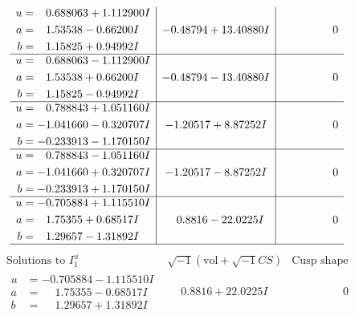 \documentclass[1p]{elsarticle_modified}
\theoremstyle{definition}
\newcommand{\I}{\sqrt{-1}}
\begin{document}
$$\begin{array}{c|c|c}
\begin{aligned}
u &= \phantom{-}0.688063 + 1.112900 I \\
a &= \phantom{-}1.53538 - 0.66200 I \\
b &= \phantom{-}1.15825 + 0.94992 I\end{aligned}
 & -0.48794 + 13.40880 I & \phantom{-0.000000 } 0 \\ \hline\begin{aligned}
u &= \phantom{-}0.688063 - 1.112900 I \\
a &= \phantom{-}1.53538 + 0.66200 I \\
b &= \phantom{-}1.15825 - 0.94992 I\end{aligned}
 & -0.48794 - 13.40880 I & \phantom{-0.000000 } 0 \\ \hline\begin{aligned}
u &= \phantom{-}0.788843 + 1.051160 I \\
a &= -1.041660 - 0.320707 I \\
b &= -0.233913 - 1.170150 I\end{aligned}
 & -1.20517 + 8.87252 I & \phantom{-0.000000 } 0 \\ \hline\begin{aligned}
u &= \phantom{-}0.788843 - 1.051160 I \\
a &= -1.041660 + 0.320707 I \\
b &= -0.233913 + 1.170150 I\end{aligned}
 & -1.20517 - 8.87252 I & \phantom{-0.000000 } 0 \\ \hline\begin{aligned}
u &= -0.705884 + 1.115510 I \\
a &= \phantom{-}1.75355 + 0.68517 I \\
b &= \phantom{-}1.29657 - 1.31892 I\end{aligned}
 & \phantom{-}0.8816 - 22.0225 I & \phantom{-0.000000 } 0\\
 \hline 
 \end{array}$$\newpage$$\begin{array}{c|c|c}  
\text{Solutions to }I^u_{1}& \I (\text{vol} + \sqrt{-1}CS) & \text{Cusp shape}\\
 \hline 
\begin{aligned}
u &= -0.705884 - 1.115510 I \\
a &= \phantom{-}1.75355 - 0.68517 I \\
b &= \phantom{-}1.29657 + 1.31892 I\end{aligned}
 & \phantom{-}0.8816 + 22.0225 I & \phantom{-0.000000 } 0 \\ \hline\begin{aligned}

\end{aligned}
\end{array}$$
\end{document}
